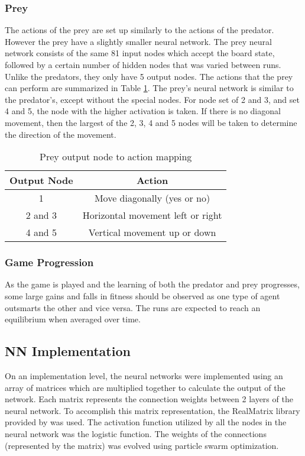 \subsubsection{Prey}
  The actions of the prey are set up similarly to the actions of the predator. However the prey have a slightly smaller neural network. The prey neural network consists of the same 81 input nodes which accept the board state, followed by a certain number of hidden nodes that was varied between runs. Unlike the predators, they only have 5 output nodes. The actions that the prey can perform are summarized in Table \ref{tab:prey-actions}. The prey's neural network is similar to the predator's, except without the special nodes. For node set of 2 and 3, and set 4 and 5, the node with the higher activation is taken. If there is no diagonal movement, then the largest of the 2, 3, 4 and 5 nodes will be taken to determine the direction of the movement.

\begin{table}
  \centering
  \begin{tabular}{|c|c|}
    \hline
    Output Node & Action \\
    \hline
    1 & Move diagonally (yes or no)\\
    2 and 3 & Horizontal movement left or right \\
    4 and 5 & Vertical movement up or down \\
    \hline
  \end{tabular}
  \caption{Prey output node to action mapping}
  \label{tab:prey-actions}
\end{table}


	
\subsubsection{Game Progression}
		As the game is played and the learning of both the predator and prey progresses, some large gains and falls in fitness should be observed as one type of agent outsmarts the other and vice versa. The runs are expected to reach an equilibrium when averaged over time. 

\subsection{NN Implementation} 
	On an implementation level, the neural networks were implemented using an array of matrices which are multiplied together to calculate the output of the network. Each matrix represents the connection weights between 2 layers of the neural network. To accomplish this matrix representation, the RealMatrix library provided by \cite{apache} was used. The activation function utilized by all the nodes in the neural network was the logistic function. The weights of the connections (represented by the matrix) was evolved using particle swarm optimization.
	
